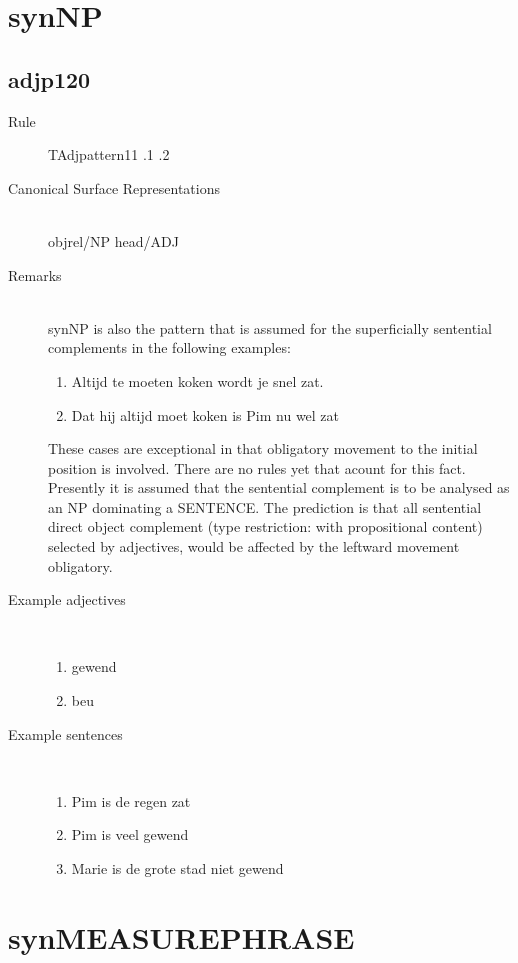 \section{synNP}
\subsection{adjp120}
\begin{description}
  \item [Rule] TAdjpattern11 .1 .2
  \item [Canonical Surface Representations] \mbox{}\\objrel/NP head/ADJ
  \item [Remarks] \mbox{}\\ synNP is also the pattern that is assumed for the
superficially sentential complements in the following examples:
\begin{enumerate}
  \item Altijd te moeten koken wordt je snel zat.
  \item Dat hij altijd moet koken is Pim nu wel zat
\end{enumerate}
These cases are exceptional in that 
obligatory movement to 
the initial position is involved. 
There are no rules yet 
that acount for this fact. Presently it is assumed that the sentential 
complement is to be analysed as an NP dominating a SENTENCE. The prediction is
that 
all sentential direct object complement (type restriction: 
with propositional 
content) selected by adjectives, would be affected by the leftward movement 
obligatory.
  \item [Example adjectives] \mbox{}\\
\begin{enumerate}
  \item gewend
  \item beu
\end{enumerate}
  \item [Example sentences] \mbox{}\\
\begin{enumerate}
  \item Pim is de regen zat
  \item Pim is veel gewend
  \item Marie is de grote stad niet gewend
\end{enumerate}
\end{description}
\newpage
\section{synMEASUREPHRASE}
